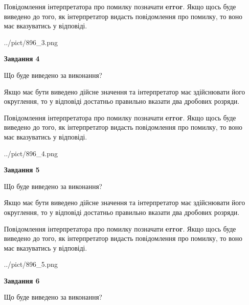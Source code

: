 \documentclass[12pt, ukrainian]{article}
\begin{document}
{\begin {Large}
Повідомлення інтерпретатора про помилку позначати \textbf{error}.
Якщо щось буде виведено до того, як інтерпретатор видасть повідомлення про помилку, 
то воно має вказуватись у відповіді. \par

\begin{center}
	{../pict/896_3.png}
\end{center}
\newpage

{\begin {center}\textbf{Завдання 4}\end {center}}\par
Що буде виведено за виконання? \par

Якщо має бути виведено дійсне значення та інтерпретатор має здійснювати його округлення, 
то у відповіді достатньо правильно вказати два дробових розряди.

Повідомлення інтерпретатора про помилку позначати \textbf{error}.
Якщо щось буде виведено до того, як інтерпретатор видасть повідомлення про помилку, 
то воно має вказуватись у відповіді. \par

\begin{center}
	{../pict/896_4.png}
\end{center}
\newpage

{\begin {center}\textbf{Завдання 5}\end {center}}\par
Що буде виведено за виконання? \par

Якщо має бути виведено дійсне значення та інтерпретатор має здійснювати його округлення, 
то у відповіді достатньо правильно вказати два дробових розряди.

Повідомлення інтерпретатора про помилку позначати \textbf{error}.
Якщо щось буде виведено до того, як інтерпретатор видасть повідомлення про помилку, 
то воно має вказуватись у відповіді. \par

\begin{center}
	{../pict/896_5.png}
\end{center}
\newpage

{\begin {center}\textbf{Завдання 6}\end {center}}\par
Що буде виведено за виконання? \par


\end{Large}}
\end{document}

